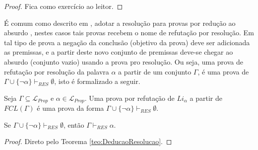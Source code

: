 \begin{proof}
    Fica como exercício ao leitor.
\end{proof}

É comum como descrito em \cite{joaoPavao2014}, adotar a resolução para provas por redução ao absurdo , nestes casos tais provas recebem o nome de refutação por resolução. Em tal tipo de prova a negação da conclusão (objetivo da prova) deve ser adicionada as premissas, e a partir deste novo conjunto de premissas deve-se chegar ao absurdo (conjunto vazio) usando a prova pro resolução. Ou seja, uma prova de refutação por resolução da palavra $\alpha$ a partir de um conjunto $\Gamma$, é uma prova de $\Gamma \cup \{\neg \alpha\} \vdash_{RES} \emptyset$, isto é formalizado a seguir.

\begin{definition}
    Seja $\Gamma \subseteq \mathcal{L}_{Prop}$ e $\alpha \in \mathcal{L}_{Prop}$. Uma prova por refutação de $Li_\alpha$ a partir de $FCL(\Gamma)$ é uma prova da forma $\Gamma \cup \{\neg \alpha\} \vdash_{RES} \emptyset$.
\end{definition}

\begin{corollary}\label{prop:DeducaoResolução}
    Se $\Gamma \cup \{\neg \alpha\} \vdash_{RES} \emptyset$, então $\Gamma \vdash_{RES} \alpha$.
\end{corollary}

\begin{proof}
    Direto pelo Teorema \ref{teo:DeducaoResolucao}.
\end{proof}

